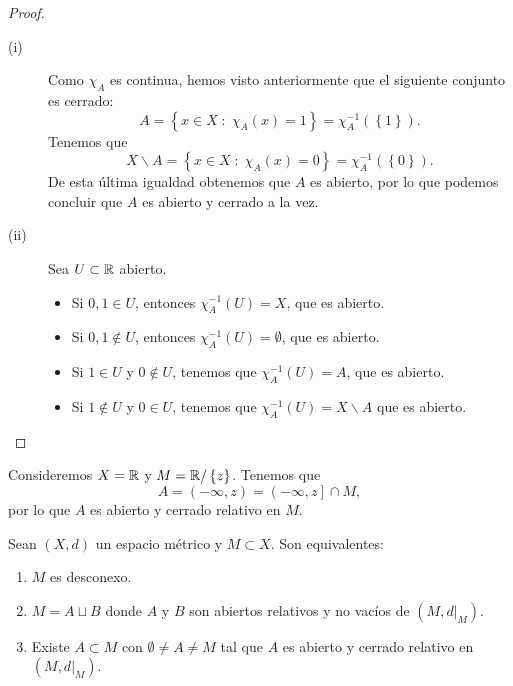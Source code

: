 \begin{proof}
\begin{description}
\item[(i)] Como $\displaystyle \chi_{A} $ es continua, hemos visto anteriormente que el siguiente conjunto es cerrado:
	\[A = \left\{ x \in X \; : \; \chi_{A}\left(x\right) = 1\right\}  = \chi_{A}^{-1}\left( \left\{ 1\right\} \right) .\]
	Tenemos que 
	\[X\backslash A = \left\{ x \in X \; : \; \chi_{A}\left(x\right) = 0\right\}  = \chi_{A}^{-1}\left( \left\{ 0\right\} \right) .\]
	De esta última igualdad obtenemos que $\displaystyle A $ es abierto, por lo que podemos concluir que $\displaystyle A $ es abierto y cerrado a la vez. 
\item[(ii)] Sea $\displaystyle U \subset \mathbb{R} $ abierto. 
	\begin{itemize}
	\item Si $\displaystyle 0,1 \in U $, entonces $\displaystyle \chi_{A}^{-1}\left(U\right) = X $, que es abierto. 
	\item Si $\displaystyle 0,1 \not\in U $, entonces $\displaystyle \chi_{A}^{-1}\left(U\right) = \emptyset $, que es abierto.
	\item Si $\displaystyle 1 \in U $ y $\displaystyle 0 \not\in U $, tenemos que $\displaystyle \chi_{A}^{-1}\left(U\right) = A $, que es abierto.
	\item Si $\displaystyle 1 \not\in U $ y $\displaystyle 0 \in U $, tenemos que $\displaystyle \chi_{A}^{-1}\left(U\right) = X \backslash A $ que es abierto. 
	\end{itemize}
\end{description}
\end{proof}
\begin{eg}
	Consideremos $\displaystyle X = \mathbb{R} $ y $\displaystyle M = \mathbb{R}/ \left\{ z\right\}  $. Tenemos que 
	\[ A =\left(-\infty, z\right) = \left(-\infty,z\right] \cap M ,\]
	por lo que $\displaystyle A $ es abierto y cerrado relativo en $\displaystyle M $. 
\end{eg}
\begin{theorem}
Sean $\displaystyle \left(X,d\right) $ un espacio métrico y $\displaystyle M \subset X $. Son equivalentes:
\begin{enumerate}
\item $\displaystyle M $ es desconexo.
\item $\displaystyle M = A \sqcup B $ donde $\displaystyle A $ y $\displaystyle B $ son abiertos relativos y no vacíos de $\displaystyle \left(M, d|_{M}\right) $. 
\item Existe $\displaystyle A \subset M $ con $\displaystyle \emptyset \neq A \neq M $ tal que $\displaystyle A $ es abierto y cerrado relativo en $\displaystyle \left(M, d|_{M}\right) $. 
\end{enumerate}
\end{theorem}
